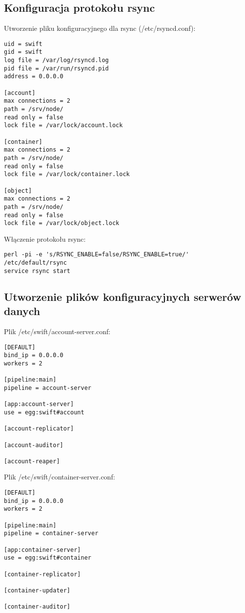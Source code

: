 \documentclass[12pt]{article}
\begin{document}
\subsection{Konfiguracja protokołu rsync}

Utworzenie pliku konfiguracyjnego dla rsync (/etc/rsyncd.conf):

\begin{verbatim}
uid = swift
gid = swift
log file = /var/log/rsyncd.log
pid file = /var/run/rsyncd.pid
address = 0.0.0.0

[account]
max connections = 2
path = /srv/node/
read only = false
lock file = /var/lock/account.lock

[container]
max connections = 2
path = /srv/node/
read only = false
lock file = /var/lock/container.lock

[object]
max connections = 2
path = /srv/node/
read only = false
lock file = /var/lock/object.lock
\end{verbatim}

Włączenie protokołu rsync: 

\begin{verbatim}
perl -pi -e 's/RSYNC_ENABLE=false/RSYNC_ENABLE=true/' /etc/default/rsync
service rsync start
\end{verbatim}

\subsection{Utworzenie plików konfiguracyjnych serwerów danych}

Plik /etc/swift/account-server.conf: 

\begin{verbatim}
[DEFAULT]
bind_ip = 0.0.0.0
workers = 2

[pipeline:main]
pipeline = account-server

[app:account-server]
use = egg:swift#account

[account-replicator]

[account-auditor]

[account-reaper]
\end{verbatim}

Plik /etc/swift/container-server.conf: 

\begin{verbatim}
[DEFAULT]
bind_ip = 0.0.0.0
workers = 2

[pipeline:main]
pipeline = container-server

[app:container-server]
use = egg:swift#container

[container-replicator]

[container-updater]

[container-auditor]
\end{verbatim}
\end{document}
